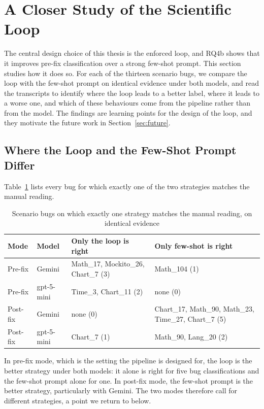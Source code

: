 \documentclass{iutbscthesis}
\begin{document}
\section{A Closer Study of the Scientific Loop}
\label{sec:loopstudy}

The central design choice of this thesis is the enforced loop, and RQ4b shows that it improves pre-fix classification over a strong few-shot prompt. This section studies how it does so. For each of the thirteen scenario bugs, we compare the loop with the few-shot prompt on identical evidence under both models, and read the transcripts to identify where the loop leads to a better label, where it leads to a worse one, and which of these behaviours come from the pipeline rather than from the model. The findings are learning points for the design of the loop, and they motivate the future work in Section~\ref{sec:future}.

\subsection{Where the Loop and the Few-Shot Prompt Differ}

Table~\ref{tab:loop_wins} lists every bug for which exactly one of the two strategies matches the manual reading.

\begin{table}[!htbp]
    \centering
    \small
    \begin{tabular}{l l p{4.6cm} p{4.6cm}}
        \toprule
        \textbf{Mode} & \textbf{Model} & \textbf{Only the loop is right} & \textbf{Only few-shot is right} \\
        \midrule
        Pre-fix  & Gemini     & Math\_17, Mockito\_26, Chart\_7 (3) & Math\_104 (1) \\
        Pre-fix  & gpt-5-mini & Time\_3, Chart\_11 (2) & none (0) \\
        \midrule
        Post-fix & Gemini     & none (0) & Chart\_17, Math\_90, Math\_23, Time\_27, Chart\_7 (5) \\
        Post-fix & gpt-5-mini & Chart\_7 (1) & Math\_90, Lang\_20 (2) \\
        \bottomrule
    \end{tabular}
    \caption{Scenario bugs on which exactly one strategy matches the manual reading, on identical evidence}
    \label{tab:loop_wins}
\end{table}

In pre-fix mode, which is the setting the pipeline is designed for, the loop is the better strategy under both models: it alone is right for five bug classifications and the few-shot prompt alone for one. In post-fix mode, the few-shot prompt is the better strategy, particularly with Gemini. The two modes therefore call for different strategies, a point we return to below.
\end{document}

